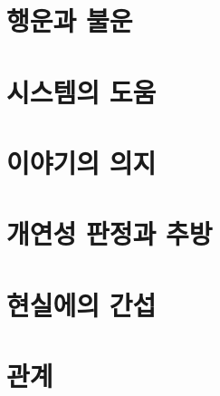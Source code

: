 \documentclass{report}
\begin{document}
	\section{행운과 불운}
		
	
	\section{시스템의 도움}
		
	
	\section{이야기의 의지}
		
	
	\section{개연성 판정과 추방}
		
	
	\section{현실에의 간섭}
		
	
	\section{관계}
		
\end{document}
